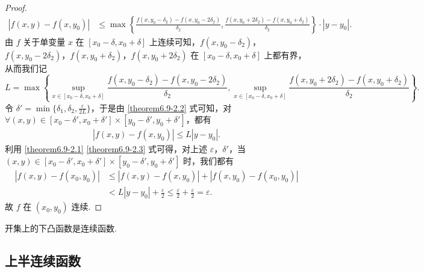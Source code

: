 \documentclass[../../main.tex]{subfiles}%
\begin{document}
\begin{proof}
\begin{align}
|f(x,y) - f(x,y_0)| &\leqslant \max\left\{\frac{f(x,y_0 - \delta_2) - f(x,y_0 - 2\delta_2)}{\delta_2},\frac{f(x,y_0 + 2\delta_2) - f(x,y_0 + \delta_2)}{\delta_2}\right\}\cdot|y - y_0|. \label{theorem6.9-2.2}
\end{align}
由 \(f\) 关于单变量 \(x\) 在 \([x_0 - \delta, x_0 + \delta]\) 上连续可知，\(f(x,y_0 - \delta_2)\)，\(f(x,y_0 - 2\delta_2)\)，\(f(x,y_0 + \delta_2)\)，\(f(x,y_0 + 2\delta_2)\) 在 \([x_0 - \delta, x_0 + \delta]\) 上都有界，从而我们记 \[L = \max\left\{\sup_{x\in [x_0 - \delta, x_0 + \delta]}\frac{f(x,y_0 - \delta_2) - f(x,y_0 - 2\delta_2)}{\delta_2},\sup_{x\in [x_0 - \delta, x_0 + \delta]}\frac{f(x,y_0 + 2\delta_2) - f(x,y_0 + \delta_2)}{\delta_2}\right\}.\]令 \(\delta' = \min\{\delta_1,\delta_2,\frac{\varepsilon}{2L}\}\)，于是由 \eqref{theorem6.9-2.2} 式可知，对 \(\forall (x,y)\in [x_0 - \delta', x_0 + \delta']\times[y_0 - \delta', y_0 + \delta']\)，都有
\begin{align}
|f(x,y) - f(x,y_0)| \leqslant L|y - y_0|. \label{theorem6.9-2.3}
\end{align}
利用 \eqref{theorem6.9-2.1} \eqref{theorem6.9-2.3} 式可得，对上述 \(\varepsilon\)，\(\delta'\)，当 \((x,y)\in [x_0 - \delta', x_0 + \delta']\times[y_0 - \delta', y_0 + \delta']\) 时，我们都有
\begin{align*}
|f(x,y) - f(x_0,y_0)| &\leqslant |f(x,y) - f(x,y_0)|+|f(x,y_0) - f(x_0,y_0)| \\
&< L|y - y_0|+\frac{\varepsilon}{2} 
\leqslant \frac{\varepsilon}{2}+\frac{\varepsilon}{2}=\varepsilon.
\end{align*}
故 \(f\) 在 \((x_0,y_0)\) 连续.

\end{proof}

\begin{corollary}[开集上的下凸函数必连续]\label{corollary:开集上的下凸函数必连续}
开集上的下凸函数是连续函数.
\end{corollary}






















\subsection{上半连续函数}
\end{document}
